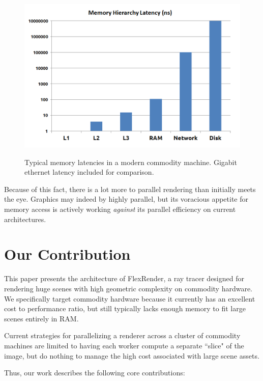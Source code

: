 \documentclass[12pt]{ucthesis}
\newcommand{\captionfonts}{\small\bf\ssp}
\begin{document}
\begin{figure}[h!]
    \centering
    \includegraphics[width=140mm]{figures/memorylatency.png}
    \captionfonts
    \caption{Typical memory latencies in a modern commodity machine. Gigabit ethernet latency included for comparison.}
    \label{fig:memlatency}
\end{figure}

Because of this fact, there is a lot more to parallel rendering than initially
meets the eye. Graphics may indeed by highly parallel, but its voracious appetite
for memory access is actively working \emph{against} its parallel efficiency on
current architectures.

\section{Our Contribution}
\label{contribution}

This paper presents the architecture of FlexRender, a ray tracer designed for
rendering huge scenes with high geometric complexity on commodity hardware. We
specifically target commodity hardware because it currently has an excellent
cost to performance ratio, but still typically lacks enough memory to fit large
scenes entirely in RAM.

Current strategies for parallelizing a renderer across a cluster of commodity
machines are limited to having each worker compute a separate ``slice" of the
image, but do nothing to manage the high cost associated with large scene
assets.

Thus, our work describes the following core contributions:
\end{document}
